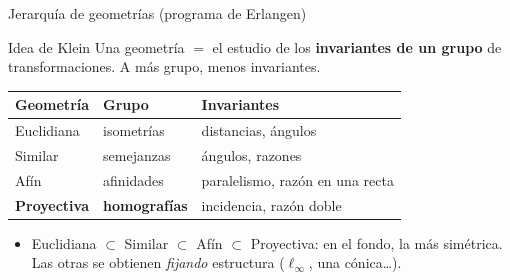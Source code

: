 \documentclass[aspectratio=169]{beamer}
\begin{document}
\begin{frame}{Jerarquía de geometrías (programa de Erlangen)}
  \begin{block}{Idea de Klein}
    Una geometría $=$ el estudio de los \textbf{invariantes de un grupo} de
    transformaciones. A más grupo, menos invariantes.
  \end{block}
  \vspace{0.2cm}
  \centering
  \begin{tabular}{l l l}
    \toprule
    \textbf{Geometría} & \textbf{Grupo} & \textbf{Invariantes}\\
    \midrule
    Euclidiana & isometrías & distancias, ángulos\\
    Similar    & semejanzas & ángulos, razones\\
    Afín       & afinidades & paralelismo, razón en una recta\\
    \textbf{Proyectiva} & \textbf{homografías} & incidencia, razón doble\\
    \bottomrule
  \end{tabular}
  \vspace{0.3cm}
  \begin{itemize}
    \item Euclidiana $\subset$ Similar $\subset$ Afín $\subset$
          \alert{Proyectiva}: en el fondo, la más simétrica. Las otras se
          obtienen \emph{fijando} estructura ($\ell_\infty$, una cónica\ldots).
  \end{itemize}
\end{frame}
\end{document}
